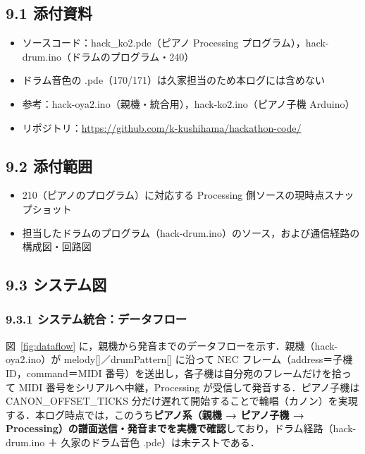 \documentclass[a4paper,11pt]{ltjsarticle}
\providecommand{\％}{\%}
\begin{document}
\subsection*{9.1 添付資料}

\begin{itemize}
    \item ソースコード：hack\_ko2.pde（ピアノ Processing プログラム），hack-drum.ino（ドラムのプログラム・240）
    \item ドラム音色の .pde（170/171）は久家担当のため本ログには含めない
    \item 参考：hack-oya2.ino（親機・統合用），hack-ko2.ino（ピアノ子機 Arduino）
    \item リポジトリ：\url{https://github.com/k-kushihama/hackathon-code/}
\end{itemize}

\subsection*{9.2 添付範囲}

\begin{itemize}
    \item 210（ピアノのプログラム）に対応する Processing 側ソースの現時点スナップショット
    \item 担当したドラムのプログラム（hack-drum.ino）のソース，および通信経路の構成図・回路図
\end{itemize}

\subsection*{9.3 システム図}

\subsubsection*{9.3.1 システム統合：データフロー}

図~\ref{fig:dataflow} に，親機から発音までのデータフローを示す．親機（hack-oya2.ino）が melody[]／drumPattern[] に沿って NEC フレーム（address＝子機 ID，command＝MIDI 番号）を送出し，各子機は自分宛のフレームだけを拾って MIDI 番号をシリアルへ中継，Processing が受信して発音する．ピアノ子機は CANON\_OFFSET\_TICKS 分だけ遅れて開始することで輪唱（カノン）を実現する．本ログ時点では，このうち\textbf{ピアノ系（親機 → ピアノ子機 → Processing）の譜面送信・発音までを実機で確認}しており，ドラム経路（hack-drum.ino ＋ 久家のドラム音色 .pde）は未テストである．
\end{document}
